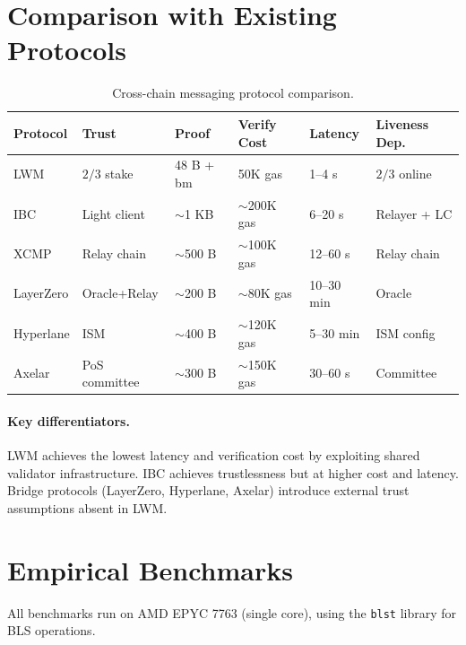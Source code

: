 \documentclass[11pt,a4paper]{article}
\begin{document}
\section{Comparison with Existing Protocols}\label{sec:comparison}

\begin{table}[H]
\centering
\caption{Cross-chain messaging protocol comparison.}
\label{tab:comparison}
\begin{tabular}{p{2.2cm}p{1.8cm}p{1.5cm}p{2cm}p{1.8cm}p{2cm}}
\toprule
\textbf{Protocol} & \textbf{Trust} & \textbf{Proof} & \textbf{Verify Cost} & \textbf{Latency} & \textbf{Liveness Dep.} \\
\midrule
LWM & $2/3$ stake & 48 B + bm & 50K gas & 1--4 s & $2/3$ online \\
IBC & Light client & $\sim$1 KB & $\sim$200K gas & 6--20 s & Relayer + LC \\
XCMP & Relay chain & $\sim$500 B & $\sim$100K gas & 12--60 s & Relay chain \\
LayerZero & Oracle+Relay & $\sim$200 B & $\sim$80K gas & 10--30 min & Oracle \\
Hyperlane & ISM & $\sim$400 B & $\sim$120K gas & 5--30 min & ISM config \\
Axelar & PoS committee & $\sim$300 B & $\sim$150K gas & 30--60 s & Committee \\
\bottomrule
\end{tabular}
\end{table}

\paragraph{Key differentiators.} LWM achieves the lowest latency and verification cost by exploiting shared validator infrastructure. IBC achieves trustlessness but at higher cost and latency. Bridge protocols (LayerZero, Hyperlane, Axelar) introduce external trust assumptions absent in LWM.

\section{Empirical Benchmarks}\label{sec:benchmarks}

All benchmarks run on AMD EPYC 7763 (single core), using the \texttt{blst} library for BLS operations.
\end{document}

